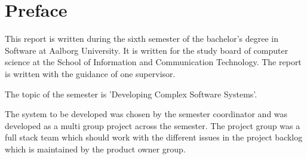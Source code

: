 \chapter*{Preface}
This report is written during the sixth semester of the bachelor's degree in Software at Aalborg University.
It is written for the study board of computer science at the School of Information and Communication Technology.
The report is written with the guidance of one supervisor.

The topic of the semester is 'Developing Complex Software Systems'.

The system to be developed was chosen by the semester coordinator and was developed as a multi group project across the semester. 
The project group was a full stack team which should work with the different issues in the project backlog which is maintained by the product owner group.



\newpage
